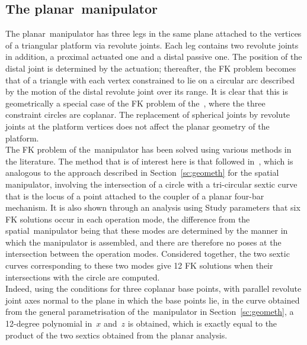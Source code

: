 \documentclass[DD]{iitmdiss}
\newcommand{\mref}[1]{\ref{#1}}
\newcommand{\mcite}[1]{\cite{#1}}
\newcommand{\mlabel}[1]{\label{#1}}
\begin{document}
\subsection{The planar~\rrr manipulator} \mlabel{sc:rrr}
%
The planar~\rrr manipulator has three legs in the same plane attached to the vertices of a triangular platform via revolute joints. Each leg contains two revolute joints in addition, a proximal actuated one and a distal passive one. The position of the distal joint is determined by the actuation; thereafter, the FK problem becomes that of a triangle with each vertex constrained to lie on a circular arc described by the motion of the distal revolute joint over its range. It is clear that this is geometrically a special case of the FK problem of the~\rps, where the three constraint circles are coplanar. The replacement of spherical joints by revolute joints at the platform vertices does not affect the planar geometry of the platform.\\
The FK problem of the~\rrr manipulator has been solved using various methods in the literature. The method that is of interest here is that followed in~\mcite{baskar2017}, which is analogous to the approach described in Section~\mref{sc:geometh} for the spatial manipulator, involving the intersection of a circle with a tri-circular sextic curve that is the locus of a point attached to the coupler of a planar four-bar mechanism. It is also shown through an analysis using Study parameters  that six FK solutions occur in each operation mode, the difference from the spatial~\rps manipulator being that these modes are determined by the manner in which the manipulator is assembled, and there are therefore no poses at the intersection between the operation modes. Considered together, the two sextic curves corresponding to these two modes give 12 FK solutions when their intersections with the circle are computed.\\
Indeed, using the conditions for three coplanar base points, with parallel revolute joint axes normal to the plane in which the base points lie, in the curve obtained from the general parametrisation of the~\rps manipulator in Section~\mref{sc:geometh}, a 12-degree polynomial in~$x$ and~$z$ is obtained, which is exactly equal to the product of the two sextics obtained from the planar analysis.
%
\end{document}
